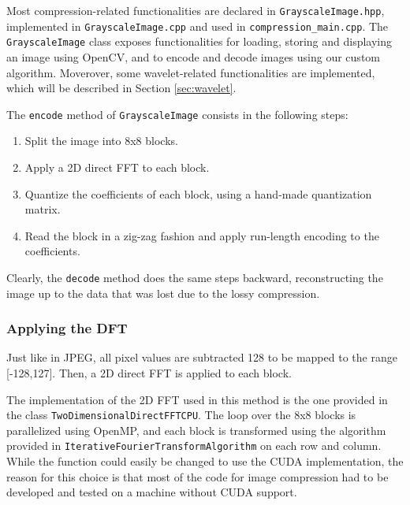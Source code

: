 Most compression-related functionalities are declared in \texttt{Grayscale\-Image.hpp}, implemented in \texttt{Grayscale\-Image.cpp} and used in \texttt{compression\_\-main\-.cpp}. The \texttt{GrayscaleImage} class exposes functionalities for loading, storing and displaying an image using OpenCV, and to encode and decode images using our custom algorithm. Moverover, some wavelet-related functionalities are implemented, which will be described in Section \ref{sec:wavelet}.

The \texttt{encode} method of \texttt{Grayscale\-Image} consists in the following steps:
\begin{enumerate}
    \item Split the image into 8x8 blocks.
    \item Apply a 2D direct FFT to each block.
    \item Quantize the coefficients of each block, using a hand-made quantization matrix.
    \item Read the block in a zig-zag fashion and apply run-length encoding to the coefficients.
\end{enumerate}
Clearly, the \texttt{decode} method does the same steps backward, reconstructing the image up to the data that was lost due to the lossy compression.

\subsubsection{Applying the DFT}
Just like in JPEG, all pixel values are subtracted 128 to be mapped to the range [-128,127]. Then, a 2D direct FFT is applied to each block.

The implementation of the 2D FFT used in this method is the one provided in the class \texttt{Two\-Dimensional\-Direct\-FFT\-CPU}. The loop over the 8x8 blocks is parallelized using OpenMP, and each block is transformed using the algorithm provided in \texttt{Iterative\-Fourier\-Transform\-Algorithm} on each row and column. While the function could easily be changed to use the CUDA implementation, the reason for this choice is that most of the code for image compression had to be developed and tested on a machine without CUDA support. 

